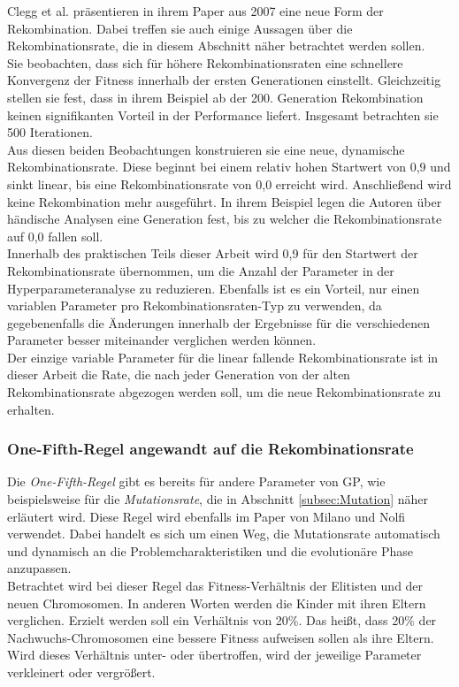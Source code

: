 Clegg et al. präsentieren in ihrem Paper aus 2007 eine neue Form der Rekombination.
Dabei treffen sie auch einige Aussagen über die Rekombinationsrate, die in diesem Abschnitt näher betrachtet werden sollen. \cite{clegg_new_2007}\\
Sie beobachten, dass sich für höhere Rekombinationsraten eine schnellere Konvergenz der Fitness innerhalb der ersten Generationen einstellt.
Gleichzeitig stellen sie fest, dass in ihrem Beispiel ab der 200. Generation Rekombination keinen signifikanten Vorteil in der Performance liefert.
Insgesamt betrachten sie 500 Iterationen.\\
Aus diesen beiden Beobachtungen konstruieren sie eine neue, dynamische Rekombinationsrate.
Diese beginnt bei einem relativ hohen Startwert von 0,9 und sinkt linear, bis eine Rekombinationsrate von 0,0 erreicht wird.
Anschließend wird keine Rekombination mehr ausgeführt.
In ihrem Beispiel legen die Autoren über händische Analysen eine Generation fest, bis zu welcher die Rekombinationsrate auf 0,0 fallen soll.\\
Innerhalb des praktischen Teils dieser Arbeit wird 0,9 für den Startwert der Rekombinationsrate übernommen, um die Anzahl der Parameter in der Hyperparameteranalyse zu reduzieren.
Ebenfalls ist es ein Vorteil, nur einen variablen Parameter pro Rekombinationsraten-Typ zu verwenden, da gegebenenfalls die Änderungen innerhalb der Ergebnisse für die verschiedenen Parameter besser miteinander verglichen werden können.\\
Der einzige variable Parameter für die linear fallende Rekombinationsrate ist in dieser Arbeit die Rate, die nach jeder Generation von der alten Rekombinationsrate abgezogen werden soll, um die neue Rekombinationsrate zu erhalten.

\subsubsection{One-Fifth-Regel angewandt auf die Rekombinationsrate}
\label{subsubsec:oneFifthCrossover}

Die \emph{One-Fifth-Regel} gibt es bereits für andere Parameter von GP, wie beispielsweise für die \emph{Mutationsrate}, die in Abschnitt \ref{subsec:Mutation} näher erläutert wird.
Diese Regel wird ebenfalls im Paper von Milano und Nolfi verwendet.
Dabei handelt es sich um einen Weg, die Mutationsrate automatisch und dynamisch an die Problemcharakteristiken und die evolutionäre Phase anzupassen. \cite{milano_scaling_2018}\\
Betrachtet wird bei dieser Regel das Fitness-Verhältnis der Elitisten und der neuen Chromosomen.
In anderen Worten werden die Kinder mit ihren Eltern verglichen.
Erzielt werden soll ein Verhältnis von 20\%.
Das heißt, dass 20\% der Nachwuchs-Chromosomen eine bessere Fitness aufweisen sollen als ihre Eltern.
Wird dieses Verhältnis unter- oder übertroffen, wird der jeweilige Parameter verkleinert oder vergrößert. \cite{doerr_self-adjusting_2019}


